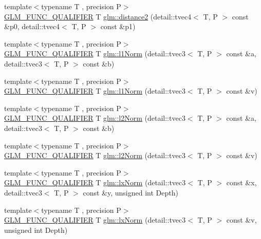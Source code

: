 \begin{DoxyCompactItemize}
\item 
{\footnotesize template$<$typename T , precision P$>$ }\\\hyperlink{setup_8hpp_a33fdea6f91c5f834105f7415e2a64407}{G\+L\+M\+\_\+\+F\+U\+N\+C\+\_\+\+Q\+U\+A\+L\+I\+F\+I\+ER} T \hyperlink{namespaceglm_a20cbd12ccd2a5306fbdb0542c2700e67}{glm\+::distance2} (detail\+::tvec4$<$ T, P $>$ const \&p0, detail\+::tvec4$<$ T, P $>$ const \&p1)
\item 
{\footnotesize template$<$typename T , precision P$>$ }\\\hyperlink{setup_8hpp_a33fdea6f91c5f834105f7415e2a64407}{G\+L\+M\+\_\+\+F\+U\+N\+C\+\_\+\+Q\+U\+A\+L\+I\+F\+I\+ER} T \hyperlink{group__gtx__norm_gae7c48d18df3e4a9c13bb9c003e434d5f}{glm\+::l1\+Norm} (detail\+::tvec3$<$ T, P $>$ const \&a, detail\+::tvec3$<$ T, P $>$ const \&b)
\item 
{\footnotesize template$<$typename T , precision P$>$ }\\\hyperlink{setup_8hpp_a33fdea6f91c5f834105f7415e2a64407}{G\+L\+M\+\_\+\+F\+U\+N\+C\+\_\+\+Q\+U\+A\+L\+I\+F\+I\+ER} T \hyperlink{group__gtx__norm_ga466d01e7b4350f44250d80ec48128fbd}{glm\+::l1\+Norm} (detail\+::tvec3$<$ T, P $>$ const \&v)
\item 
{\footnotesize template$<$typename T , precision P$>$ }\\\hyperlink{setup_8hpp_a33fdea6f91c5f834105f7415e2a64407}{G\+L\+M\+\_\+\+F\+U\+N\+C\+\_\+\+Q\+U\+A\+L\+I\+F\+I\+ER} T \hyperlink{group__gtx__norm_ga46af6669c4e8b042e284dd3b6c0caf28}{glm\+::l2\+Norm} (detail\+::tvec3$<$ T, P $>$ const \&a, detail\+::tvec3$<$ T, P $>$ const \&b)
\item 
{\footnotesize template$<$typename T , precision P$>$ }\\\hyperlink{setup_8hpp_a33fdea6f91c5f834105f7415e2a64407}{G\+L\+M\+\_\+\+F\+U\+N\+C\+\_\+\+Q\+U\+A\+L\+I\+F\+I\+ER} T \hyperlink{group__gtx__norm_gacdfd8d645b91db95a191a1294226571b}{glm\+::l2\+Norm} (detail\+::tvec3$<$ T, P $>$ const \&v)
\item 
{\footnotesize template$<$typename T , precision P$>$ }\\\hyperlink{setup_8hpp_a33fdea6f91c5f834105f7415e2a64407}{G\+L\+M\+\_\+\+F\+U\+N\+C\+\_\+\+Q\+U\+A\+L\+I\+F\+I\+ER} T \hyperlink{group__gtx__norm_gaf2ec2a2b14e0d4ddfadd5b1a98ed9799}{glm\+::lx\+Norm} (detail\+::tvec3$<$ T, P $>$ const \&x, detail\+::tvec3$<$ T, P $>$ const \&y, unsigned int Depth)
\item 
{\footnotesize template$<$typename T , precision P$>$ }\\\hyperlink{setup_8hpp_a33fdea6f91c5f834105f7415e2a64407}{G\+L\+M\+\_\+\+F\+U\+N\+C\+\_\+\+Q\+U\+A\+L\+I\+F\+I\+ER} T \hyperlink{group__gtx__norm_ga7f76252fa0266db34865dba8a8c0f7d6}{glm\+::lx\+Norm} (detail\+::tvec3$<$ T, P $>$ const \&v, unsigned int Depth)
\end{DoxyCompactItemize}
